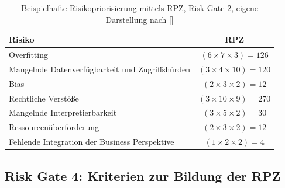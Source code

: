 \begin{table}[H]
\centering
\begin{tabular}{|p{9cm}|c|}
\hline
\textbf{Risiko} & \textbf{RPZ} \\ \hline
Overfitting & $(6 \times 7 \times 3) = 126$ \\ \hline
Mangelnde Datenverfügbarkeit und Zugriffshürden & $(3 \times 4 \times 10) = 120$ \\ \hline
Bias & $(2 \times 3 \times 2) = 12$ \\ \hline
Rechtliche Verstöße & $(3 \times 10 \times 9) = 270$ \\ \hline
Mangelnde Interpretierbarkeit & $(3 \times 5 \times 2) = 30$ \\ \hline
Ressourcenüberforderung & $(2 \times 3 \times 2) = 12$ \\ \hline
Fehlende Integration der Business Perspektive & $(1 \times 2 \times 2) = 4$ \\ \hline
\end{tabular}
\caption{Beispielhafte Risikopriorisierung mittels RPZ, Risk Gate 2, eigene Darstellung nach []}
\label{tab:rpz_risiken}
\end{table}

\subsection{Risk Gate 4: Kriterien zur Bildung der RPZ}

